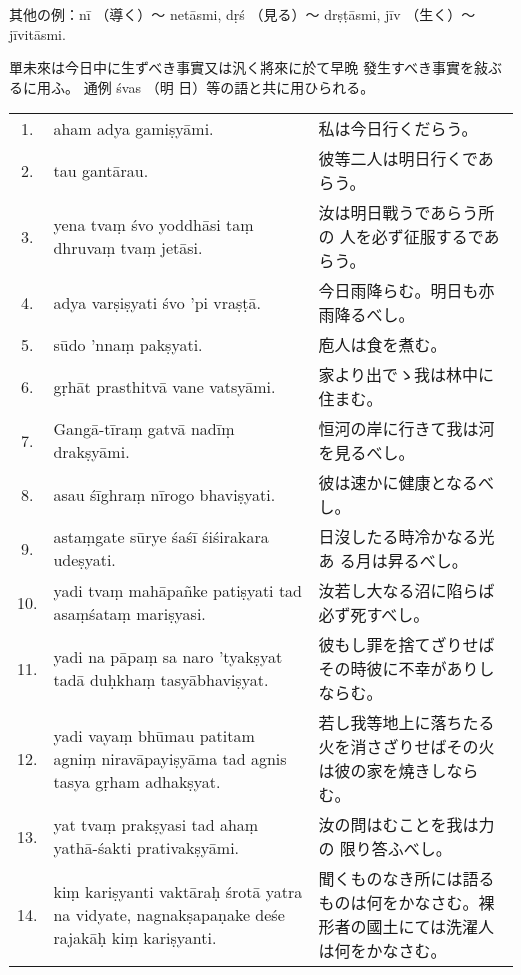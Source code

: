其他の例：nī （導く）～ netāsmi, dṛś （見る）～ drṣṭāsmi, jīv
（生く）～ jīvitāsmi.

\numberParagraph
單未來は今日中に生ずべき事實又は汎く將來に於て早晩
發生すべき事實を敍ぶるに用ふ。 通例 śvas （明
日）等の語と共に用ひられる。

\begin{longtable}{c*{2}{p{0.45\hsize}}}
 1. & aham adya gamiṣyāmi. & 私は今日行くだらう。\\
 2. & tau gantārau. & 彼等二人は明日行くであらう。\\
 3. & yena tvaṃ śvo yoddhāsi taṃ dhruvaṃ tvaṃ jetāsi. & 汝は明日戰うであらう所の
人を必ず征服するであらう。\\
 4. & adya varṣiṣyati śvo 'pi vraṣṭā. & 今日雨降らむ。明日も亦雨降るべし。\\
 5. & sūdo 'nnaṃ pakṣyati. & 庖人は食を煮む。\\
 6. & gṛhāt prasthitvā vane vats\-yāmi. & 家より出でゝ我は林中に住まむ。\\
 7. & Gangā-tīraṃ gatvā nadīṃ drakṣyāmi. & 恒河の岸に行きて我は河を見るべし。\\
 8. & asau śīghraṃ nīrogo bhavi\-ṣyati. & 彼は速かに健康となるべし。\\
 9. & astaṃgate sūrye śaśī śiśira\-kara udeṣyati. & 日沒したる時冷かなる光あ
る月は昇るべし。\\
10. & yadi tvaṃ mahā\-pañke pati\-ṣyati tad asaṃśataṃ mariṣyasi.
& 汝若し大なる沼に陷らば必ず死すべし。\\
11. & yadi na pāpaṃ sa naro 'tyakṣyat tadā duḥkhaṃ tasyā\-bhaviṣyat.
& 彼もし罪を捨てざりせばその時彼に不幸がありしならむ。\\
12. & yadi vayaṃ bhūmau patitam agniṃ niravāpayiṣyāma tad agnis tasya gṛham adhakṣyat.
& 若し我等地上に落ちたる火を消さざりせばその火は彼の家を燒きしならむ。\\
13. & yat tvaṃ prakṣyasi tad ahaṃ yathā-śakti prativakṣyāmi. & 汝の問はむことを我は力の
限り答ふべし。\\
14. & kiṃ kariṣyanti vaktāraḥ śrotā yatra na vidyate, nagna\-kṣapaṇake deśe rajakāḥ kiṃ
kariṣyanti. & 聞くものなき所には語るものは何をかなさむ。裸形者の國土にては洗濯人は何をかなさむ。
\end{longtable}


